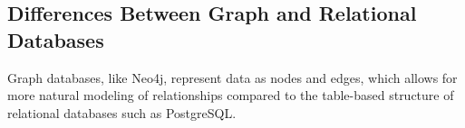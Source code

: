\subsection{Differences Between Graph and Relational Databases}
Graph databases, like Neo4j, represent data as nodes and edges, which allows for more natural modeling of relationships compared to the table-based structure of relational databases such as PostgreSQL.
